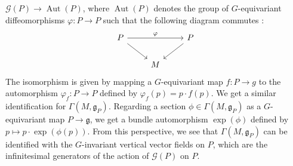 \documentclass[psamsfonts, 12pt]{amsart}
\theoremstyle{definition}
\theoremstyle{remark}
\newcommand{\g}{\mathfrak{g}}
\DeclareMathOperator{\Aut}{Aut}
\begin{document}
$\mathscr{G}(P) \to \Aut(P)$, where $\Aut(P)$ denotes the group of
$G$-equivariant diffeomorphisms $\varphi : P \to P$ such that
the following diagram commutes :
\[\begin{tikzcd}
P \ar[dr] \ar[rr, "\varphi"] && P \ar[dl] \\
& M
\end{tikzcd}\]
The isomorphism is given by mapping a $G$-equivariant map $f : P \to g$
to the automorphism $\varphi_f : P \to P$ defined by $\varphi_f(p) = p\cdot f(p)$.
We get a similar identification for $\Gamma(M, \g_P)$. Regarding a section
$\phi \in \Gamma(M,\g_P)$ as a $G$-equivariant map $P \to \g$, we get
a bundle automorphism $\exp(\phi)$ defined by $p\mapsto p\cdot\exp(\phi(p))$. From
this perspective, we see that $\Gamma(M,\g_P)$ can be identified with the $G$-invariant
vertical vector fields on $P$, which are the infinitesimal generators of the action
of $\mathscr{G}(P)$ on $P$. \\
\end{document}
